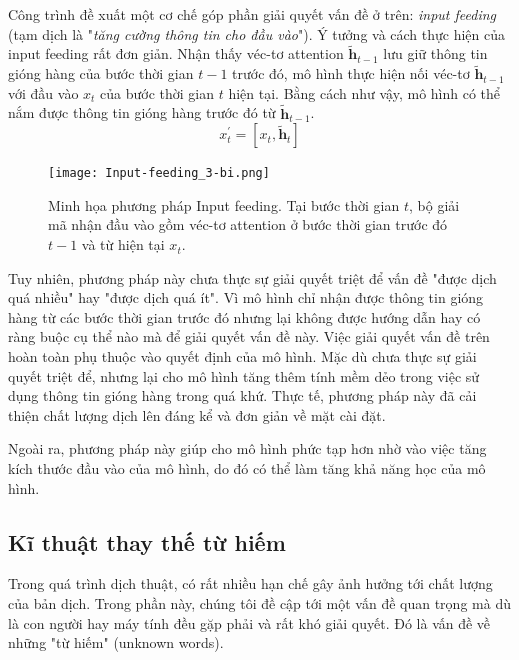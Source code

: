 Công trình \cite{attentionThangLuong2015} đề xuất một cơ chế góp phần giải quyết vấn đề ở trên: \textit{input feeding} (tạm dịch là "\textit{tăng cường thông tin cho đầu vào}"). Ý tưởng và cách thực hiện của input feeding rất đơn giản. Nhận thấy véc-tơ attention $\bm{\tilde{h}}_{t-1}$ lưu giữ thông tin gióng hàng của bước thời gian $t-1$ trước đó, mô hình thực hiện nối véc-tơ $\bm{\tilde{h}}_{t-1}$ với đầu vào $x_t$ của bước thời gian $t$ hiện tại. Bằng cách như vậy, mô hình có thể nắm được thông tin gióng hàng trước đó từ $\bm{\tilde{h}}_{t-1}$.
\begin{equation}
x^{'}_t = [x_t, \bm{\tilde{h}}_t]
\end{equation}

\begin{figure}
	\centering
	\texttt{[image: Input-feeding\_3-bi.png]}
	\caption[Minh họa cơ chế Attention Cục bộ.]{Minh họa phương pháp Input feeding. Tại bước thời gian $t$, bộ giải mã nhận đầu vào gồm véc-tơ attention ở bước thời gian trước đó $t-1$ và từ hiện tại $x_t$.}
	\label{fig_Input_feeding}
\end{figure}
Tuy nhiên, phương pháp này chưa thực sự giải quyết triệt để vấn đề "được dịch quá nhiều" hay "được dịch quá ít". Vì mô hình chỉ nhận được thông tin gióng hàng từ các bước thời gian trước đó nhưng lại không được hướng dẫn hay có ràng buộc cụ thể nào mà để giải quyết vấn đề này. Việc giải quyết vấn đề trên hoàn toàn phụ thuộc vào quyết định của mô hình. Mặc dù chưa thực sự giải quyết triệt để, nhưng lại cho mô hình tăng thêm tính mềm dẻo trong việc sử dụng thông tin gióng hàng trong quá khứ. Thực tế, phương pháp này đã cải thiện chất lượng dịch lên đáng kể và đơn giản về mặt cài đặt.

Ngoài ra, phương pháp này giúp cho mô hình phức tạp hơn nhờ vào việc tăng kích thước đầu vào của mô hình, do đó có thể làm tăng khả năng học của mô hình.

\subsection{Kĩ thuật thay thế từ hiếm}
Trong quá trình dịch thuật, có rất nhiều hạn chế gây ảnh hưởng tới chất lượng của bản dịch. Trong phần này, chúng tôi đề cập tới một vấn đề quan trọng mà dù là con người hay máy tính đều gặp phải và rất khó giải quyết. Đó là vấn đề về những "từ hiếm" (unknown words). 

